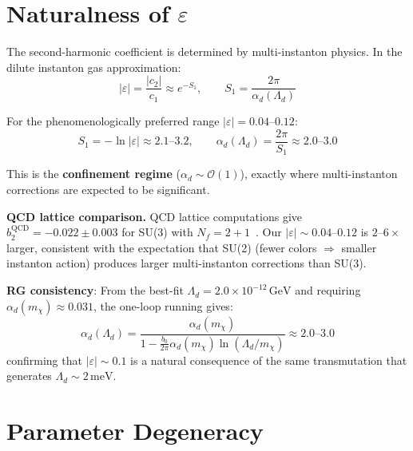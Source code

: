 \documentclass[11pt,a4paper]{article}
\newcommand{\Ld}{\Lambda_d}
\newcommand{\meV}{\,\mathrm{meV}}
\newcommand{\GeV}{\,\mathrm{GeV}}
\begin{document}
\section{Naturalness of $\varepsilon$}
\label{sec:naturalness}

The second-harmonic coefficient is determined by multi-instanton physics.
In the dilute instanton gas approximation:
\begin{equation}
  |\varepsilon| = \frac{|c_2|}{c_1} \approx e^{-S_1}, \qquad S_1 = \frac{2\pi}{\alpha_d(\Ld)}
\end{equation}

For the phenomenologically preferred range $|\varepsilon| = 0.04$--$0.12$:
\begin{equation}
  S_1 = -\ln|\varepsilon| \approx 2.1\text{--}3.2, \qquad
  \alpha_d(\Ld) = \frac{2\pi}{S_1} \approx 2.0\text{--}3.0
\end{equation}

This is the \textbf{confinement regime} ($\alpha_d\sim \mathcal{O}(1)$), exactly where
multi-instanton corrections are expected to be significant.

\medskip
\noindent
\textbf{QCD lattice comparison.} QCD lattice computations give $b_2^{\mathrm{QCD}} = -0.022\pm 0.003$
for SU(3) with $N_f = 2+1$~\cite{Bonati2015,Borsanyi2016}.
Our $|\varepsilon|\sim 0.04$--$0.12$ is $2$--$6\times$ larger, consistent with the expectation
that SU(2) (fewer colors $\Rightarrow$ smaller instanton action) produces larger multi-instanton
corrections than SU(3).

\medskip
\noindent
\textbf{RG consistency}: From the best-fit $\Ld = 2.0\times 10^{-12}\GeV$ and requiring
$\alpha_d(m_\chi)\approx 0.031$, the one-loop running gives:
\begin{equation}
  \alpha_d(\Ld) = \frac{\alpha_d(m_\chi)}{1 - \frac{b_0}{2\pi}\alpha_d(m_\chi)\ln(\Ld/m_\chi)}
  \approx 2.0\text{--}3.0
\end{equation}
confirming that $|\varepsilon|\sim 0.1$ is a natural consequence of the same
transmutation that generates $\Ld\sim 2\meV$.

\section{Parameter Degeneracy}
\label{sec:degeneracy}
\end{document}
